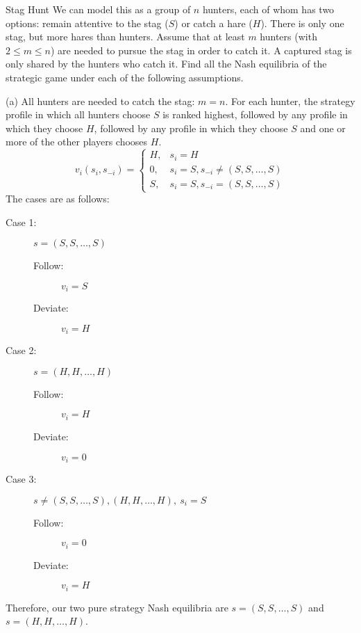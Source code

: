 \documentclass[10pt]{extarticle}
\begin{document}
\begin{problem}{Stag Hunt}
    We can model this as a group of $n$ hunters, each of whom has two options: remain attentive to the stag ($S$) or catch a hare ($H$). There is only one stag, but more hares than hunters. Assume that at least $m$ hunters (with $2\leq m\leq n$) are needed to pursue the stag in order to catch it. A captured stag is only shared by the hunters who catch it. Find all the Nash equilibria of the strategic game under each of the following assumptions.
    \begin{problem}{(a)}
      All hunters are needed to catch the stag: $m=n$. For each hunter, the strategy profile in which all hunters choose $S$ is ranked highest, followed by any profile in which they choose $H$, followed by any profile in which they choose $S$ and one or more of the other players chooses $H$.
      \tcblower
      \[
        v_i(s_i,s_{-i}) = \begin{cases}
          H, & s_i = H\\
          0, & s_i = S, s_{-i}\neq (S,S,\dots,S)\\
          S, & s_i = S, s_{-i} = (S,S,\dots,S)
        \end{cases}
      \] 
      The cases are as follows:
      \begin{description}
        \item[Case 1:] $s = (S,S,\dots,S)$
          \begin{description}
            \item[Follow:] $v_i = S$
            \item[Deviate:] $v_i = H$
          \end{description}
        \item[Case 2:] $s = (H,H,\dots,H)$
          \begin{description}
            \item[Follow:] $v_i = H$
            \item[Deviate:] $v_i = 0$
          \end{description}
        \item[Case 3:] $s \neq (S,S,\dots,S), (H,H,\dots,H),~s_i = S$ 
          \begin{description}
            \item[Follow:] $v_i = 0$
            \item[Deviate:] $v_i = H$
          \end{description}
      \end{description}
      Therefore, our two pure strategy Nash equilibria are $s=(S,S,\dots,S)$ and $s = (H,H,\dots,H)$.

\end{problem}
\end{problem}
\end{document}

